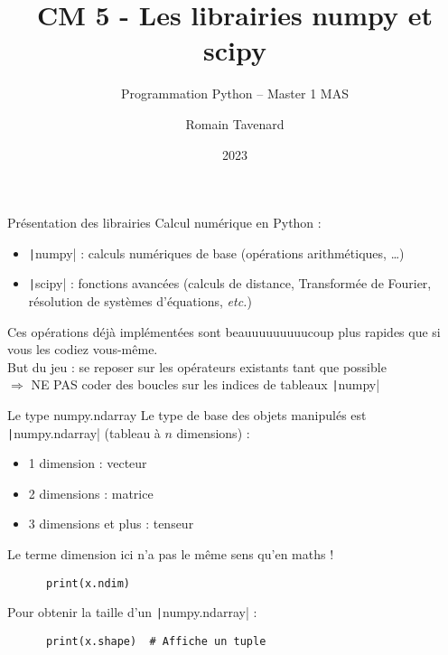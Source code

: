 \documentclass[10pt]{beamer}
\title[M1 MAS -- Python -- numpy]{CM 5 - Les librairies numpy et scipy}
\subtitle{Programmation Python -- Master 1 MAS}
\author{Romain Tavenard}
\date{2023}
\institute{%
\hypersetup{urlcolor=.}
\makebox[2.2ex][c]{\faEnvelope}\enspace\href{mailto:romain.tavenard@univ-rennes2.fr}{\texttt{romain.tavenard@univ-rennes2.fr}}\\%
}
\begin{document}
\maketitle

\begin{frame}[fragile]{Présentation des librairies}  
  Calcul numérique en Python :
  \begin{itemize}
    \item \texttt|numpy| : calculs numériques de base (opérations arithmétiques, \dots)
    \item \texttt|scipy| : fonctions avancées (calculs de distance, Transformée de Fourier, résolution de systèmes d'équations, \emph{etc.})
  \end{itemize}

  \pause

  Ces opérations déjà implémentées sont \alert{beauuuuuuuuucoup} plus rapides que si vous les codiez vous-même. \\
  \alert{But du jeu :} se reposer sur les opérateurs existants tant que possible \\
  $\Rightarrow$ \alert{NE PAS} coder des boucles sur les indices de tableaux \texttt|numpy|

\end{frame}

\begin{frame}[fragile]{Le type numpy.ndarray}  
  Le type de base des objets manipulés est \texttt|numpy.ndarray| (tableau à $n$ dimensions) :
  \begin{itemize}
    \item 1 dimension : vecteur
    \item 2 dimensions : matrice
    \item 3 dimensions et plus : tenseur
  \end{itemize}

  \alert{Le terme dimension ici n'a pas le même sens qu'en maths !}

  \begin{beamercodeblock}
    \begin{verbatim}
      print(x.ndim)
    \end{verbatim}
  \end{beamercodeblock}

  Pour obtenir la taille d'un \texttt|numpy.ndarray| : 

  \begin{beamercodeblock}
    \begin{verbatim}
      print(x.shape)  # Affiche un tuple
    \end{verbatim}
  \end{beamercodeblock}
\end{frame}
\end{document}
